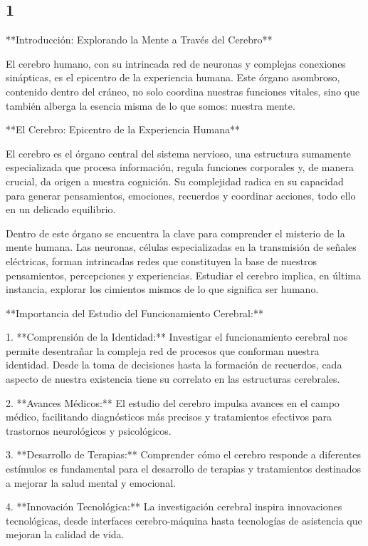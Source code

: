 \documentclass{article}
\begin{document}
	\subsection{1}
	**Introducción: Explorando la Mente a Través del Cerebro**
	
	El cerebro humano, con su intrincada red de neuronas y complejas conexiones sinápticas, es el epicentro de la experiencia humana. Este órgano asombroso, contenido dentro del cráneo, no solo coordina nuestras funciones vitales, sino que también alberga la esencia misma de lo que somos: nuestra mente.
	
	**El Cerebro: Epicentro de la Experiencia Humana**
	
	El cerebro es el órgano central del sistema nervioso, una estructura sumamente especializada que procesa información, regula funciones corporales y, de manera crucial, da origen a nuestra cognición. Su complejidad radica en su capacidad para generar pensamientos, emociones, recuerdos y coordinar acciones, todo ello en un delicado equilibrio.
	
	Dentro de este órgano se encuentra la clave para comprender el misterio de la mente humana. Las neuronas, células especializadas en la transmisión de señales eléctricas, forman intrincadas redes que constituyen la base de nuestros pensamientos, percepciones y experiencias. Estudiar el cerebro implica, en última instancia, explorar los cimientos mismos de lo que significa ser humano.
	
	**Importancia del Estudio del Funcionamiento Cerebral:**
	
	1. **Comprensión de la Identidad:** Investigar el funcionamiento cerebral nos permite desentrañar la compleja red de procesos que conforman nuestra identidad. Desde la toma de decisiones hasta la formación de recuerdos, cada aspecto de nuestra existencia tiene su correlato en las estructuras cerebrales.
	
	2. **Avances Médicos:** El estudio del cerebro impulsa avances en el campo médico, facilitando diagnósticos más precisos y tratamientos efectivos para trastornos neurológicos y psicológicos.
	
	3. **Desarrollo de Terapias:** Comprender cómo el cerebro responde a diferentes estímulos es fundamental para el desarrollo de terapias y tratamientos destinados a mejorar la salud mental y emocional.
	
	4. **Innovación Tecnológica:** La investigación cerebral inspira innovaciones tecnológicas, desde interfaces cerebro-máquina hasta tecnologías de asistencia que mejoran la calidad de vida.
	
\end{document}

